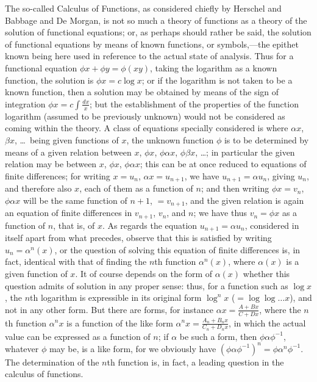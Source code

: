\documentclass[11pt,a4paper]{article}
\begin{document}
The so-called Calculus of Functions, as considered chiefly by Herschel and Babbage and De Morgan, is not so much a theory of functions as a theory of the solution of functional equations; or, as perhaps should rather be said, the solution of functional equations by means of known functions, or symbols,---the epithet known being here used in reference to the actual state of analysis. Thus for a functional equation $\phi x + \phi y = \phi(xy)$, taking the logarithm as a known function, the solution is $\phi x = c\log x$; or if the logarithm is not taken to be a known function, then a solution may be obtained by means of the sign of integration $\phi x = c\int\frac{dx}{x}$; but the establishment of the properties of the function logarithm (assumed to be previously unknown) would not be considered as coming within the theory. A class of equations specially considered is where $\alpha x$, $\beta x$, \ldots\ being given functions of $x$, the unknown function $\phi$ is to be determined by means of a given relation between $x$, $\phi x$, $\phi\alpha x$, $\phi\beta x$, \ldots; in particular the given relation may be between $x$, $\phi x$, $\phi\alpha x$; this can be at once reduced to equations of finite differences; for writing $x = u_{n}$, $\alpha x = u_{n+1}$, we have $u_{n+1} = \alpha u_{n}$, giving $u_{n}$, and therefore also $x$, each of them as a function of $n$; and then writing $\phi x = v_{n}$, $\phi\alpha x$ will be the same function of $n + 1$, $= v_{n+1}$, and the given relation is again an equation of finite differences in $v_{n+1}$, $v_{n}$, and $n$; we have thus $v_{n} = \phi x$ as a function of $n$, that is, of $x$. As regards the equation $u_{n+1} = \alpha u_{n}$, considered in itself apart from what precedes, observe that this is satisfied by writing $u_{n} = \alpha^{n}(x)$, or the question of solving this equation of finite differences is, in fact, identical with that of finding the $n$th function $\alpha^{n}(x)$, where $\alpha(x)$ is a given function of $x$. It of course depends on the form of $\alpha(x)$ whether this question admits of solution in any proper sense: thus, for a function such as $\log x$, the $n$th logarithm is expressible in its original form $\log^{n}x$ ($= \log\log\ldots x$), and not in any other form. But there are forms, for instance $\alpha x = \frac{A + Bx}{C + Dx}$, where the $n$th function $\alpha^{n}x$ is a function of the like form $\alpha^{n}x = \frac{A_{n} + B_{n}x}{C_{n} + D_{n}x}$, in which the actual value can be expressed as a function of $n$; if $\alpha$ be such a form, then $\phi\alpha\phi^{-1}$, whatever $\phi$ may be, is a like form, for we obviously have $(\phi\alpha\phi^{-1})^{n} = \phi\alpha^{n}\phi^{-1}$. The determination of the $n$th function is, in fact, a leading question in the calculus of functions.
\end{document}
